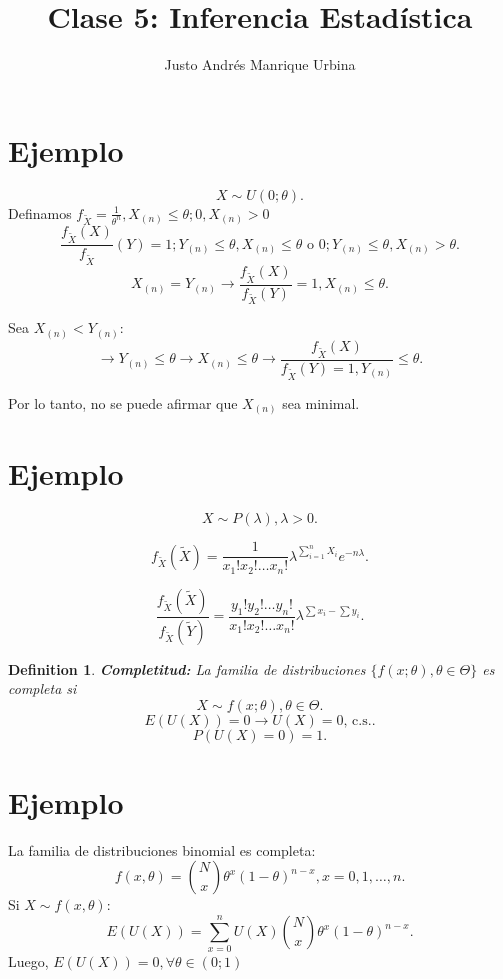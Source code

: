 \documentclass{article}
\title{Clase 5: Inferencia Estadística}
\author{Justo Andrés Manrique Urbina}
\newtheorem{mydef}{Definition}
\begin{document}
\maketitle

\section{Ejemplo}
\[ X \sim U(0;\theta).\]
Definamos $f_{\tilde{X}}=\frac{1}{\theta^{n}}, X_{{(n)}} \leq \theta; 0, X_{{(n)}} > 0$
\[ \frac{f_{\tilde{X}}{(X)}}{f_{\tilde{X}}}{(Y)}=1; Y_{{(n)}}\leq \theta, X_{{(n)}}\leq \theta \text{ o } 0; Y_{{(n)}} \leq \theta, X_{{(n)}}>\theta.\]
\[ X_{{(n)}}=Y_{{(n)}} \rightarrow \frac{f_{{\tilde{X}}}{(X)}}{f_{{\tilde{X}}}{(Y)}}=1, X_{{(n)}} \leq \theta.\]

Sea $X_{{(n)}}<Y_{{(n)}}$:
\[ \rightarrow Y_{{(n)}} \leq \theta \rightarrow X_{{(n)}} \leq \theta \rightarrow \frac{f_{\tilde{X}}{(X)}}{f_{\tilde{X}}{(Y)}=1, Y_{{(n)}}} \leq \theta.\]

Por lo tanto, no se puede afirmar que $X_{{(n)}}$ sea minimal.

\section{Ejemplo}
\[ X\sim P(\lambda), \lambda > 0.\]

\[ f_{\tilde{X}}(\tilde{X})=\frac{1}{x_{1}!x_{2}!\ldots x_{n}!}\lambda^{\sum_{i=1}^{n}X_{i}}e^{-n\lambda}.\]

\[ \frac{f_{\tilde{X}}{(\tilde{X})}}{f_{\tilde{X}}{(\tilde{Y})}}=\frac{y_{1}!y_{2}!\ldots y_{n}!}{x_{1}!x_{2}!\ldots x_{n}!}\lambda^{\sum x_{i} - \sum y_{i}}.\]

\begin{mydef}
	\textbf{Completitud: } La familia de distribuciones $\{f{(x;\theta), \theta \in \Theta}\}$ es completa si
	\[ X\sim f{(x;\theta)}, \theta \in \Theta.\]
	\[ E{(U{(X)})}=0 \rightarrow U{(X)} = 0\text{, c.s.}.\]
	\[  P{(U{(X)}=0)}=1.\]
\end{mydef}

\section{Ejemplo}
La familia de distribuciones binomial es completa:
\[ f{(x,\theta)}= \binom{N}{x} \theta^{x}{(1-\theta)}^{n-x},x=0,1,\ldots,n.\]
Si $X \sim f{(x,\theta)}$:
\[ E{(U{(X)})}=\sum_{x=0}^{n}U{(X)}\binom{N}{x}\theta^{x}{(1-\theta)}^{n-x}.\]
Luego, $E{(U{(X)})}=0, \forall \theta \in {(0;1)}$
\end{document}
